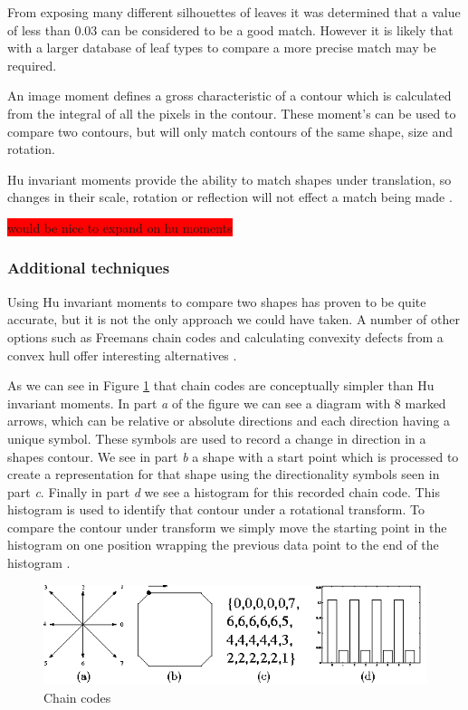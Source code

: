 From exposing many different silhouettes of leaves it was determined that a value of less than 0.03 can be considered to be a good match. However it is likely that with a larger database of leaf types to compare a more precise match may be required.

An image moment defines a gross characteristic of a contour which is calculated from the integral of all the pixels in the contour. These moment’s can be used to compare two contours, but will only match contours of the same shape, size and rotation.

Hu invariant moments provide the ability to match shapes under translation, so changes in their scale, rotation or reflection will not effect a match being made \cite{shutler02, rizon06}.

\colorbox{red}{would be nice to expand on hu moments}

\subsubsection{Additional techniques}
Using Hu invariant moments to compare two shapes has proven to be quite accurate, but it is not the only approach we could have taken. A number of other options such as Freemans chain codes and calculating convexity defects from a convex hull offer interesting alternatives \cite{park05, iivarinen97}. 

As we can see in Figure \ref{chain_codes} that chain codes are conceptually simpler than Hu invariant moments. In part \emph{a} of the figure we can see a diagram with 8 marked arrows, which can be relative or absolute directions and each direction having a unique symbol. These symbols are used to record a change in direction in a shapes contour. We see in part \emph{b} a shape with a start point which is processed to create a representation for that shape using the directionality symbols seen in part \emph{c}. Finally in part \emph{d} we see a histogram for this recorded chain code. This histogram is used to identify that contour under a rotational transform. To compare the contour under transform we simply move the starting point in the histogram on one position wrapping the previous data point to the end of the histogram \cite{anderson06}.

\begin{figure}[h!]
\centering
    \includegraphics[width=.7\textwidth]{leaf_identification/images/chain_codes.png}
    \caption{Chain codes}%
    \label{chain_codes}
\end{figure}

